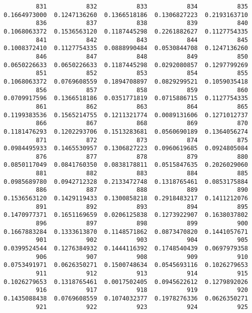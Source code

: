 \documentclass[
  letterpaper,
  DIV=11,
  numbers=noendperiod]{scrreprt}
\begin{document}
\begin{verbatim}
          831           832           833           834           835 
 0.1664973000  0.1247136260  0.1366518186  0.1306827223  0.2193163710 
          836           837           838           839           840 
 0.1068063372  0.1536563120  0.1187445298  0.2261882627  0.1127754335 
          841           842           843           844           845 
 0.1008372410  0.1127754335  0.0888990484  0.0530844708  0.1247136260 
          846           847           848           849           850 
 0.0650226633  0.0650226633  0.1187445298  0.0292080857  0.1297799269 
          851           852           853           854           855 
 0.1068063372  0.0769608559  0.1894708897  0.0829299521  0.1059035418 
          856           857           858           859           860 
 0.0709917596  0.1366518186  0.0351771819  0.0715886715  0.1127754335 
          861           862           863           864           865 
 0.1199383536  0.1565214755  0.1211321774  0.0089131606  0.1271012737 
          866           867           868           869           870 
 0.1181476293  0.1202293706  0.1513283681  0.0560690189  0.1364056274 
          871           872           873           874           875 
 0.0984495933  0.1465530957  0.1306827223  0.0960619685  0.0924805084 
          876           877           878           879           880 
 0.0850117049  0.0841760350  0.0838178811  0.0515847635  0.2026029060 
          881           882           883           884           885 
 0.0985689780  0.0942712328  0.2133472748  0.1318765461  0.0853175884 
          886           887           888           889           890 
 0.1536563120  0.1429119433  0.1300858218  0.2918483217  0.1411212076 
          891           892           893           894           895 
 0.1470977371  0.1651169659  0.0206125838  0.1273922907  0.1638037802 
          896           897           898           899           900 
 0.1667883284  0.1333613870  0.1148571862  0.0873470820  0.1441057671 
          901           902           903           904           905 
 0.0399524544  0.1276384932  0.1444116392  0.1748540439  0.0697979358 
          906           907           908           909           910 
 0.0753491971  0.0626350271  0.1500748634  0.0545693116  0.1026279653 
          911           912           913           914           915 
 0.1026279653  0.1318765461  0.0017502405  0.0945622612  0.1279892026 
          916           917           918           919           920 
 0.1435088438  0.0769608559  0.1074032377  0.1978276336  0.0626350271 
          921           922           923           924           925 

\end{verbatim}
\end{document}
